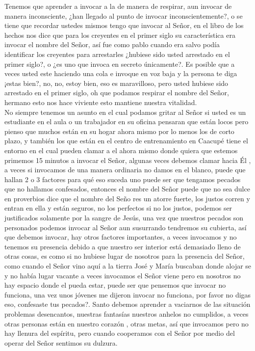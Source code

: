 \documentclass[12pt]{article}
\begin{document}
Tenemos que aprender a invocar a la de manera de respirar, aun invocar de manera inconsciente, ¿han llegado al punto de invocar inconscientemente?, o se tiene que recordar ustedes mismos tengo que invocar al Señor, en el libro de los hechos nos dice que para los creyentes en el primer siglo su característica era invocar el nombre del Señor, así fue como pablo cuando era salvo podía identificar los creyentes para arrestarles ¿hubiese sido usted arrestado en el primer siglo?, o ¿es uno que invoca en secreto únicamente?. Es posible que a veces usted este haciendo una cola e invoque en voz baja y la persona te diga ¡estas bien?, no, no, estoy bien, eso es maravilloso, pero usted hubiese sido arrestado en el primer siglo, oh que podamos respirar el nombre del Señor, hermano esto nos hace viviente esto mantiene nuestra vitalidad. \\

No siempre tenemos un asunto en el cual podamos gritar al Señor si usted es un estudiante en el aula o un trabajador en su oficina pensaran que están locos pero pienso que muchos están en su hogar ahora mismo por lo menos los de corto plazo, y también los que están en el centro de entrenamiento en Caacupé tiene el entorno en el cual pueden clamar a el ahora mismo donde quiera que estemos primemos 15 minutos a invocar el Señor, algunas veces debemos clamar hacia Él , a veces si invocamos de una manera ordinaria no damos en el blanco, puede que hallan 2 o 3 factores para qué eso suceda uno puede ser que tengamos pecados que no hallamos confesados, entonces el nombre del Señor puede que no sea dulce en proverbios dice que el nombre del Seño res un atorre fuerte, los justos corren y entran en ella y están seguros, no los perfectos si no los justos, podemos ser justificados solamente por la sangre de Jesús, una vez que nuestros pecados son personados podemos invocar al Señor aun susurrando tendremos su cubierta, así que debemos invocar, hay otros factores importantes, a veces invocamos y no tenemos su presencia debido a que nuestro ser interior está demasiado lleno de otras cosas, es como si no hubiese lugar de nosotros para la presencia del Señor, como cuando el Señor vino aquí a la tierra José y María buscaban donde alojar se y no había lugar vacante a veces invocamos el Señor viene pero en nosotros no hay espacio donde el pueda estar, puede ser que pensemos que invocar no funciona, una vez unos jóvenes me dijeron invocar no funciona, por favor no digas eso,  confesaste tus pecados?. Santo debemos aprender a vaciarnos de las situación problemas desencantos, nuestras fantasías nuestros anhelos no cumplidos, a veces otras personas están en nuestro corazón , otras metas, así que invocamos pero no hay llenura del espíritu, pero cuando cooperamos con el Señor por medio del operar del Señor sentimos su dulzura.\\
\end{document}
